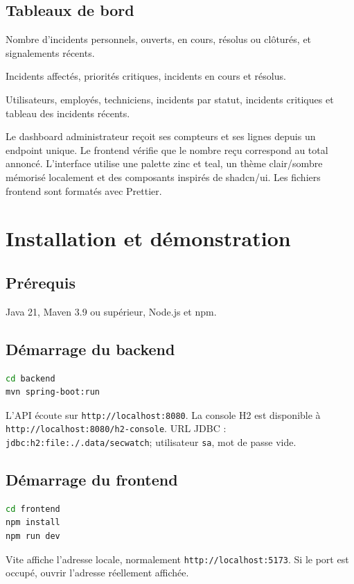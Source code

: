 \documentclass[12pt,a4paper,oneside]{report}
\begin{document}
\section{Tableaux de bord}
\begin{description}[leftmargin=2.8cm,style=nextline]
  \item[EMPLOYEE] Nombre d'incidents personnels, ouverts, en cours, résolus ou clôturés, et signalements récents.
  \item[TECHNICIAN] Incidents affectés, priorités critiques, incidents en cours et résolus.
  \item[ADMIN] Utilisateurs, employés, techniciens, incidents par statut, incidents critiques et tableau des incidents récents.
\end{description}

Le dashboard administrateur reçoit ses compteurs et ses lignes depuis un endpoint unique. Le frontend vérifie que le nombre reçu correspond au total annoncé. L'interface utilise une palette zinc et teal, un thème clair/sombre mémorisé localement et des composants inspirés de shadcn/ui. Les fichiers frontend sont formatés avec Prettier.

\chapter{Installation et démonstration}
\section{Prérequis}
Java 21, Maven 3.9 ou supérieur, Node.js et npm.

\section{Démarrage du backend}
\begin{lstlisting}[language=bash,caption={Lancer Spring Boot}]
cd backend
mvn spring-boot:run
\end{lstlisting}
L'API écoute sur \texttt{http://localhost:8080}. La console H2 est disponible à \texttt{http://localhost:8080/h2-console}. URL JDBC : \texttt{jdbc:h2:file:./.data/secwatch}; utilisateur \texttt{sa}, mot de passe vide.

\section{Démarrage du frontend}
\begin{lstlisting}[language=bash,caption={Lancer React}]
cd frontend
npm install
npm run dev
\end{lstlisting}
Vite affiche l'adresse locale, normalement \texttt{http://localhost:5173}. Si le port est occupé, ouvrir l'adresse réellement affichée.
\end{document}
